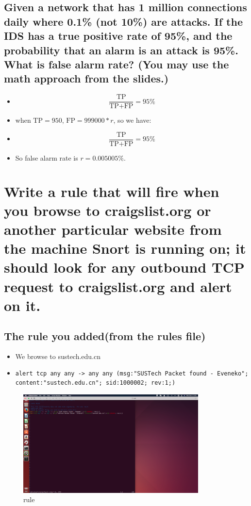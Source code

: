 \documentclass[onecolumn,oneside]{SUSTechHomework}
\begin{document}
    \subsection{Given a network that has 1 million connections daily where 0.1\% (not 10\%) are attacks. If the IDS has a true positive rate of 95\%, and the probability that an alarm is an attack is 95\%. What is false alarm rate? (You may use the math approach from the slides.)}

      \begin{itemize}
        \item[] $$\frac{ \mbox{TP}}{\mbox{TP}+\mbox{FP}}=95\%$$
        \item[] when $\mbox{TP}=950$, $\mbox{FP}=999000*r$, so we have:
        \item[] $$\frac{ \mbox{TP}}{\mbox{TP}+\mbox{FP}}=95\%$$
        \item[] So false alarm rate is $𝑟 = 0.005005\%$.
      \end{itemize}

  \section{Write a rule that will fire when you browse to craigslist.org or another particular website from the machine Snort is running on; it should look for any outbound TCP request to craigslist.org and alert on it.}

    \subsection{The rule you added(from the rules file)}

      \begin{itemize}
        \item We browse to sustech.edu.cn
        \item[] \begin{lstlisting}
alert tcp any any -> any any (msg:"SUSTech Packet found - Eveneko"; content:"sustech.edu.cn"; sid:1000002; rev:1;)
                \end{lstlisting}
      \end{itemize}

      \begin{figure}[H]
        \centering
        \includegraphics[width=0.85\textwidth]{img/pic1.png}
        \caption{rule}
      \end{figure}
  
\end{document}
